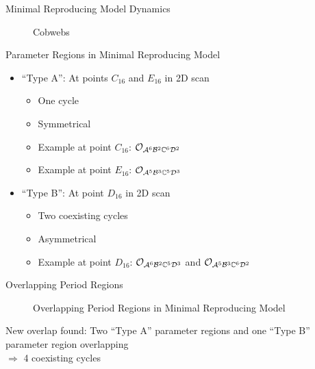 \begin{frame}{Minimal Reproducing Model Dynamics}
	\begin{figure}
		\centering
		\caption{Cobwebs}
	\end{figure}
\end{frame}

\begin{frame}{Parameter Regions in Minimal Reproducing Model}
	\begin{itemize}
		\item ``Type A'': At points $C_{16}$ and $E_{16}$ in 2D scan
		      \begin{itemize}
			      \item One cycle
			      \item Symmetrical
			      \item Example at point $C_{16}$: $\mathcal{O}_{\mathcal{A}^6\mathcal{B}^2\mathbb{C}^6\mathcal{D}^2}$
			      \item Example at point $E_{16}$: $\mathcal{O}_{\mathcal{A}^5\mathcal{B}^3\mathbb{C}^5\mathcal{D}^3}$ \vspace*{1em}
		      \end{itemize}
		\item ``Type B'': At point $D_{16}$ in 2D scan
		      \begin{itemize}
			      \item Two coexisting cycles
			      \item Asymmetrical
			      \item Example at point $D_{16}$: $\mathcal{O}_{\mathcal{A}^6\mathcal{B}^2\mathbb{C}^5\mathcal{D}^3}$ and $\mathcal{O}_{\mathcal{A}^5\mathcal{B}^3\mathbb{C}^6\mathcal{D}^2}$
		      \end{itemize}
	\end{itemize}
\end{frame}

\begin{frame}{Overlapping Period Regions}
	\vspace{-1.0em}
	\begin{figure}
		\centering
		\caption{Overlapping Period Regions in Minimal Reproducing Model}
	\end{figure}
\end{frame}

\begin{frame}
	New overlap found:
	Two ``Type A'' parameter regions and one ``Type B'' parameter region overlapping \\
	$\Rightarrow$ 4 coexisting cycles


\end{frame}








